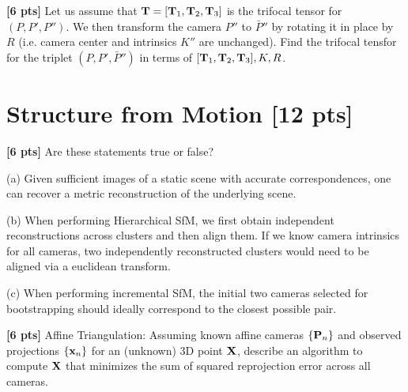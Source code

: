 \documentclass[11pt,addpoints,answers]{exam}
\numberwithin{equation}{section} %
\numberwithin{figure}{section} %
\numberwithin{table}{section} %
\begin{document}
\begin{questions}
\begin{tcolorbox}[fit,height=2cm, width=\textwidth, blank, borderline={0.5pt}{-2pt},halign=left, valign=center, nobeforeafter]


\end{tcolorbox}

\question \textbf{[6 pts]} Let us assume that $\mathbf{T} = [\mathbf{T}_1, \mathbf{T}_2, \mathbf{T}_3]$ is the trifocal tensor for $(P, P', P'')$. We then transform the camera $P''$ to $\bar{P}''$ by rotating it in place by $R$ (i.e. camera center and intrinsics $K''$ are unchanged). Find the trifocal tensfor for the triplet $(P, P', \bar{P}'')$ in terms of $ [\mathbf{T}_1, \mathbf{T}_2, \mathbf{T}_3], K, R$.

\begin{tcolorbox}[fit,height=4cm, width=\textwidth, blank, borderline={0.5pt}{-2pt},halign=left, valign=center, nobeforeafter]


\end{tcolorbox}

\section{Structure from Motion [12 pts]}

\question \textbf{[6 pts]} Are these statements true or false?  

(a) Given sufficient images of a static scene with accurate correspondences, one can recover a metric reconstruction of the underlying scene.

(b) When performing Hierarchical SfM, we first obtain independent reconstructions across clusters and then align them. If we know camera intrinsics for all cameras, two independently reconstructed clusters would need to be aligned via a euclidean transform.

(c) When performing incremental SfM, the initial two cameras selected for bootstrapping should ideally correspond to the closest possible pair.

\begin{tcolorbox}[fit,height=3cm, width=\textwidth, blank, borderline={0.5pt}{-2pt},halign=left, valign=center, nobeforeafter]


\end{tcolorbox}

\newpage

\question \textbf{[6 pts]} Affine Triangulation: Assuming known affine cameras $\{\mathbf{P}_n\}$ and observed projections $\{\mathbf{x}_n\}$ for an (unknown) 3D point $\mathbf{X}$, describe an algorithm to compute $\mathbf{X}$ that minimizes the sum of squared reprojection error across all cameras.

\begin{tcolorbox}[fit,height=6cm, width=\textwidth, blank, borderline={0.5pt}{-2pt},halign=left, valign=center, nobeforeafter]


\end{tcolorbox}


\end{questions}
\end{document}
